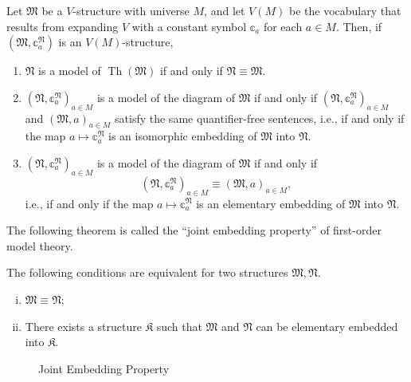 \documentclass{scrartcl}
\DeclareMathOperator{\Th}{Th}
\newcommand{\FK}{\mathfrak{K}}
\newcommand{\FM}{\mathfrak{M}}
\newcommand{\FN}{\mathfrak{N}}
\begin{document}
\begin{remarks}
Let $\FM$ be a $V$-structure with universe $M$, and let $V(M)$ be the vocabulary that results from expanding $V$ with a constant symbol $\mathbb{c}_a$ for each $a\in M$.
Then, if $(\FM, \mathbb{c}_a^{\FN})$ is an $V(M)$-structure, 

\begin{enumerate}

\item
$\FN$  is a model of $\Th(\FM)$ if and only if $\FN\equiv \FM$.

\item
$(\FN, \mathbb{c}_a^{\FN})_{a\in M}$ is a model of the diagram of $\FM$ if and only if $(\FN, \mathbb{c}_a^{\FN})_{a\in M}$ and $(\FM, a)_{a\in M}$ satisfy the same quantifier-free sentences, i.e., if and only if the map $a\mapsto  \mathbb{c}_a^{\FN}$ is an isomorphic embedding of $\FM$ into $\FN$.

\item
$(\FN, \mathbb{c}_a^{\FN})_{a\in M}$ is a model of the diagram of $\FM$ if and only if
\[
(\FN, \mathbb{c}_a^{\FN})_{a\in M}\equiv (\FM, a)_{a\in M},
\]
i.e., if and only if the map $a\mapsto  \mathbb{c}_a^{\FN}$ is an elementary embedding of $\FM$ into $\FN$.

\end{enumerate}

\end{remarks}

The following theorem is called the ``joint embedding property'' of first-order model theory.




\begin{theorem}
\label{T:joint embedding}
The following conditions are equivalent for two structures $\FM,\FN$.
\begin{enumerate}[(i)]
\item
$\FM\equiv\FN$;
\item
There exists a structure $\FK$ such that $\FM$ and $\FN$ can be elementary embedded into $\FK$.
\end{enumerate}
\end{theorem}


\begin{figure}[h!]
    \centering
    \caption{Joint Embedding Property}
\end{figure}
\end{document}
